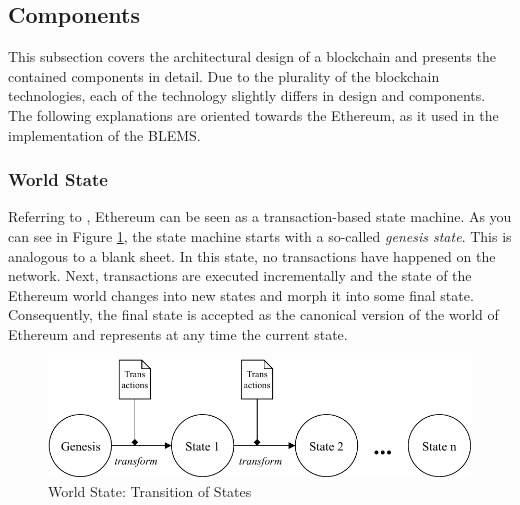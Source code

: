 \subsection{Components}
This subsection covers the architectural design of a blockchain and presents the 
contained components in detail. Due to the plurality of the blockchain technologies, 
each of the technology slightly differs in design and components. 
The following explanations are oriented towards the Ethereum, as it used 
in the implementation of the BLEMS.

\subsubsection{World State}
\label{sec:world_state}
Referring to , Ethereum 
can be seen as a transaction-based state machine.
As you can see in Figure \ref{figure:state_transition}, the state machine starts with a so-called 
\textit{genesis state}. This is analogous to a blank sheet. 
In this state, no transactions have happened on the network. 
Next, transactions are executed incrementally and the state of the Ethereum world 
changes into new states and morph it into some final state. 
Consequently, the final state 
is accepted as the canonical version of the world of Ethereum and 
represents at any time the current state.

\begin{figure}[htbp]
	\centering
	\includegraphics[width=.75\linewidth]{./figures/state_transition.pdf}
	\caption{World State: Transition of States}
	\label{figure:state_transition}
\end{figure}

